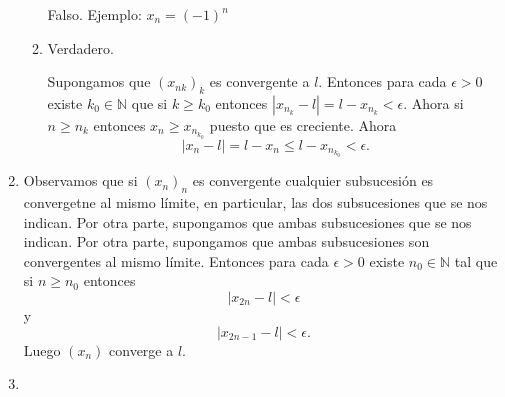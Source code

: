 \begin{enumerate}[label=\color{red}\textbf{\arabic*)}, leftmargin=*]
\begin{enumerate}[label=\color{red}\alph*)]
	Falso. Ejemplo: $x_n=(-1)^n$
	\item {}
	
	Verdadero.
	
	Supongamos que $(x_{nk})_k$ es convergente a $l$. Entonces para cada $\epsilon>0$ existe $k_0\in\mathbb{N}$ que si $k\ge k_0$ entonces $\left|x_{n_k}-l\right|=l-x_{n_k}<\epsilon$. Ahora si $n\ge n_k$ entonces $x_n\ge x_{n_{k_0}}$ puesto que es creciente. Ahora \[ \left|x_n-l\right| =l-x_n\le l-x_{n_{k_0}}<\epsilon.\]
\end{enumerate}
\item {}

Observamos que si $(x_n)_n$ es convergente cualquier subsucesión es convergetne al mismo límite, en particular, las dos subsucesiones que se nos indican. Por otra parte, supongamos que ambas subsucesiones que se nos indican. Por otra parte, supongamos que ambas subsucesiones son convergentes al mismo límite. Entonces para cada $\epsilon>0$ existe $n_0\in\mathbb{N}$ tal que si $n\ge n_0$ entonces \[ \left|x_{2n}-l\right| <\epsilon\] y \[ \left|x_{2n-1}-l\right|<\epsilon. \] Luego $(x_n)$ converge a $l$.
\item {}


\end{enumerate}
